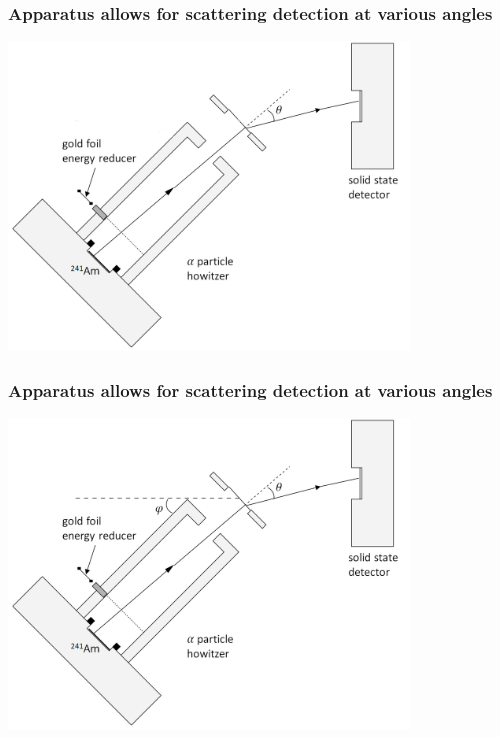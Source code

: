 \documentclass{beamer}
\begin{document}
\begin{frame}
  \frametitle{Apparatus allows for scattering detection at various angles}
  \begin{center}
  \includegraphics[width=0.8\textwidth]{apparatus-phi}
\end{center}
\end{frame}


\begin{frame}
  \frametitle{Apparatus allows for scattering detection at various angles}
  \begin{center}
  \includegraphics[width=0.8\textwidth]{apparatus}
\end{center}
\end{frame}
\end{document}
